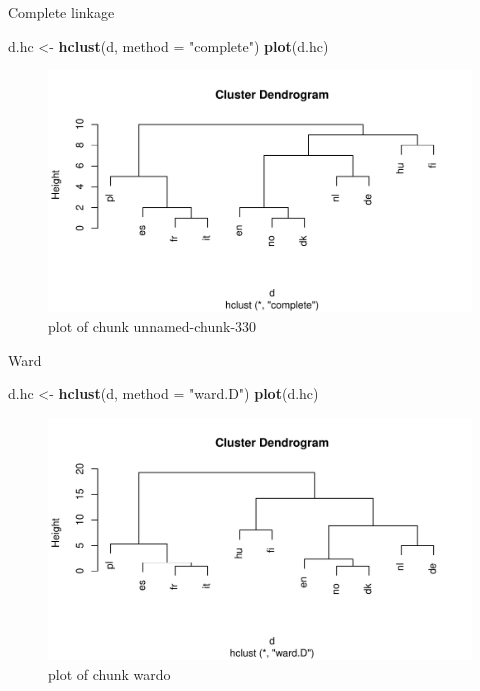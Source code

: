 \documentclass[ignorenonframetext,]{beamer}
\newenvironment{Shaded}{\begin{snugshade}}{\end{snugshade}}
\newcommand{\DataTypeTok}[1]{\textcolor[rgb]{0.13,0.29,0.53}{#1}}
\newcommand{\KeywordTok}[1]{\textcolor[rgb]{0.13,0.29,0.53}{\textbf{#1}}}
\newcommand{\NormalTok}[1]{#1}
\newcommand{\StringTok}[1]{\textcolor[rgb]{0.31,0.60,0.02}{#1}}
\begin{document}
\begin{frame}[fragile]{Complete linkage}
\protect\hypertarget{complete-linkage-1}{}

\begin{Shaded}
\begin{Highlighting}[]
\NormalTok{d.hc <-}\StringTok{ }\KeywordTok{hclust}\NormalTok{(d, }\DataTypeTok{method =} \StringTok{"complete"}\NormalTok{)}
\KeywordTok{plot}\NormalTok{(d.hc)}
\end{Highlighting}
\end{Shaded}

\begin{figure}
\centering
\includegraphics{figure/unnamed-chunk-330-1.pdf}
\caption{plot of chunk unnamed-chunk-330}
\end{figure}

\end{frame}

\begin{frame}[fragile]{Ward}
\protect\hypertarget{ward}{}

\begin{Shaded}
\begin{Highlighting}[]
\NormalTok{d.hc <-}\StringTok{ }\KeywordTok{hclust}\NormalTok{(d, }\DataTypeTok{method =} \StringTok{"ward.D"}\NormalTok{)}
\KeywordTok{plot}\NormalTok{(d.hc)}
\end{Highlighting}
\end{Shaded}

\begin{figure}
\centering
\includegraphics{figure/wardo-1.pdf}
\caption{plot of chunk wardo}
\end{figure}

\end{frame}
\end{document}
